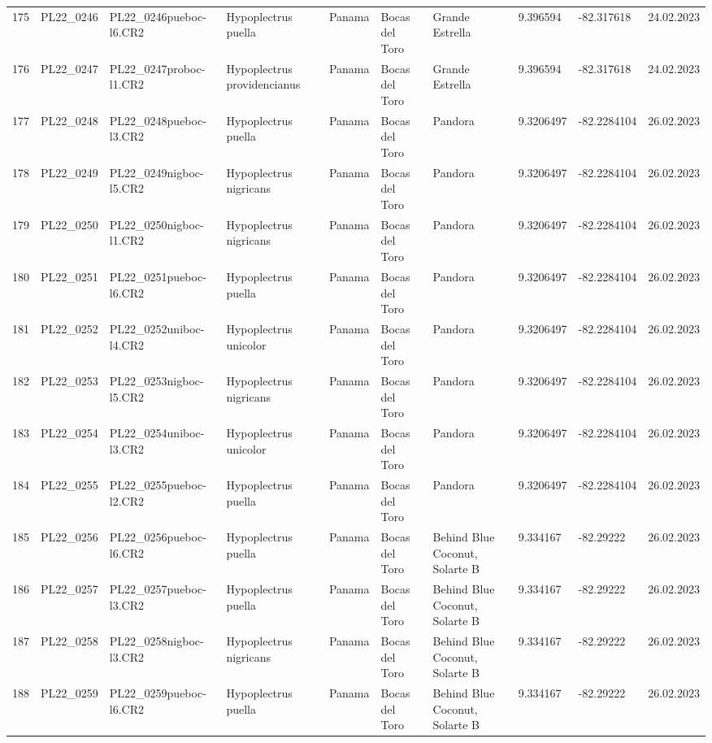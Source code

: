 \begin{table}[ht]
\begin{tabular}{rlllllllll}
  175 & PL22\_0246 & PL22\_0246pueboc-l6.CR2 & Hypoplectrus puella & Panama & Bocas del Toro & Grande Estrella & 9.396594 & -82.317618 & 24.02.2023 \\ 
  176 & PL22\_0247 & PL22\_0247proboc-l1.CR2 & Hypoplectrus providencianus & Panama & Bocas del Toro & Grande Estrella & 9.396594 & -82.317618 & 24.02.2023 \\ 
  177 & PL22\_0248 & PL22\_0248pueboc-l3.CR2 & Hypoplectrus puella & Panama & Bocas del Toro & Pandora & 9.3206497 & -82.2284104 & 26.02.2023 \\ 
  178 & PL22\_0249 & PL22\_0249nigboc-l5.CR2 & Hypoplectrus nigricans  & Panama & Bocas del Toro & Pandora & 9.3206497 & -82.2284104 & 26.02.2023 \\ 
  179 & PL22\_0250 & PL22\_0250nigboc-l1.CR2 & Hypoplectrus nigricans  & Panama & Bocas del Toro & Pandora & 9.3206497 & -82.2284104 & 26.02.2023 \\ 
  180 & PL22\_0251 & PL22\_0251pueboc-l6.CR2 & Hypoplectrus puella & Panama & Bocas del Toro & Pandora & 9.3206497 & -82.2284104 & 26.02.2023 \\ 
  181 & PL22\_0252 & PL22\_0252uniboc-l4.CR2 & Hypoplectrus unicolor & Panama & Bocas del Toro & Pandora & 9.3206497 & -82.2284104 & 26.02.2023 \\ 
  182 & PL22\_0253 & PL22\_0253nigboc-l5.CR2 & Hypoplectrus nigricans  & Panama & Bocas del Toro & Pandora & 9.3206497 & -82.2284104 & 26.02.2023 \\ 
  183 & PL22\_0254 & PL22\_0254uniboc-l3.CR2 & Hypoplectrus unicolor & Panama & Bocas del Toro & Pandora & 9.3206497 & -82.2284104 & 26.02.2023 \\ 
  184 & PL22\_0255 & PL22\_0255pueboc-l2.CR2 & Hypoplectrus puella & Panama & Bocas del Toro & Pandora & 9.3206497 & -82.2284104 & 26.02.2023 \\ 
  185 & PL22\_0256 & PL22\_0256pueboc-l6.CR2 & Hypoplectrus puella & Panama & Bocas del Toro & Behind Blue Coconut, Solarte B & 9.334167 & -82.29222 & 26.02.2023 \\ 
  186 & PL22\_0257 & PL22\_0257pueboc-l3.CR2 & Hypoplectrus puella & Panama & Bocas del Toro & Behind Blue Coconut, Solarte B & 9.334167 & -82.29222 & 26.02.2023 \\ 
  187 & PL22\_0258 & PL22\_0258nigboc-l3.CR2 & Hypoplectrus nigricans  & Panama & Bocas del Toro & Behind Blue Coconut, Solarte B & 9.334167 & -82.29222 & 26.02.2023 \\ 
  188 & PL22\_0259 & PL22\_0259pueboc-l6.CR2 & Hypoplectrus puella & Panama & Bocas del Toro & Behind Blue Coconut, Solarte B & 9.334167 & -82.29222 & 26.02.2023 \\ 

\end{tabular}
\end{table}
